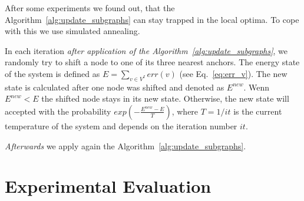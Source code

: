 \documentclass[
	fontsize=12pt,
	paper=a4,
	twoside=false,
	numbers=noenddot,
	plainheadsepline,
	toc=listof,
	toc=bibliography
]{scrartcl}
\begin{document}
After some experiments we found out, that the Algorithm~\ref{alg:update_subgraphs} can stay trapped in the local optima.
To cope with this we use simulated annealing.

In each iteration \emph{after application of the Algorithm~\ref{alg:update_subgraphs}}, we randomly try to shift a node to one of its three nearest anchors. The energy state of the system is defined as $E = \sum_{v\in V^I}err(v)$ (see Eq.~\ref{eq:err_v}). The new state is calculated after one node was shifted and denoted as $E^{new}$. Wenn $E^{new}<E$ the shifted node stays in its new state. Otherwise, the new state will accepted with the probability $exp(-\frac{E^{new}-E}{T})$, where $T = 1/{it}$ is the current temperature of the system and depends on the iteration number $it$. 

\emph{Afterwards} we apply again the Algorithm~\ref{alg:update_subgraphs}.

\section{Experimental Evaluation}
\end{document}
